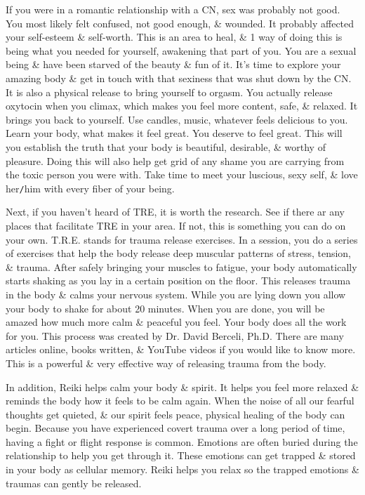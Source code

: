 \documentclass{article}
\numberwithin{equation}{section}
\begin{document}
If you were in a romantic relationship with a CN, sex was probably not good. You most likely felt confused, not good enough, \& wounded. It probably affected your self-esteem \& self-worth. This is an area to heal, \& 1 way of doing this is being what you needed for yourself, awakening that part of you. You are a sexual being \& have been starved of the beauty \& fun of it. It's time to explore your amazing body \& get in touch with that sexiness that was shut down by the CN. It is also a physical release to bring yourself to orgasm. You actually release oxytocin when you climax, which makes you feel more content, safe, \& relaxed. It brings you back to yourself. Use candles, music, whatever feels delicious to you. Learn your body, what makes it feel great. You deserve to feel great. This will you establish the truth that your body is beautiful, desirable, \& worthy of pleasure. Doing this will also help get grid of any shame you are carrying from the toxic person you were with. Take time to meet your luscious, sexy self, \& love her{\tt/}him with every fiber of your being.

Next, if you haven't heard of TRE, it is worth the research. See if there ar any places that facilitate TRE in your area. If not, this is something you can do on your own. T.R.E. stands for trauma release exercises. In a session, you do a series of exercises that help the body release deep muscular patterns of stress, tension, \& trauma. After safely bringing your muscles to fatigue, your body automatically starts shaking as you lay in a certain position on the floor. This releases trauma in the body \& calms your nervous system. While you are lying down you allow your body to shake for about 20 minutes. When you are done, you will be amazed how much more calm \& peaceful you feel. Your body does all the work for you. This process was created by Dr. David Berceli, Ph.D. There are many articles online, books written, \& YouTube videos if you would like to know more. This is a powerful \& very effective way of releasing trauma from the body.

In addition, Reiki helps calm your body \& spirit. It helps you feel more relaxed \& reminds the body how it feels to be calm again. When the noise of all our fearful thoughts get quieted, \& our spirit feels peace, physical healing of the body can begin. Because you have experienced covert trauma over a long period of time, having a fight or flight response is common. Emotions are often buried during the relationship to help you get through it. These emotions can get trapped \& stored in your body as cellular memory. Reiki helps you relax so the trapped emotions \& traumas can gently be released.
\end{document}
